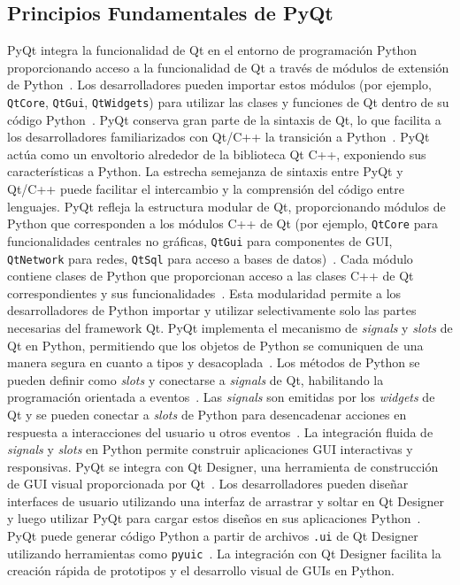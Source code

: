 \subsection{Principios Fundamentales de PyQt}
PyQt integra la funcionalidad de Qt en el entorno de programación Python proporcionando acceso a la funcionalidad de Qt a través de módulos de extensión de Python~\cite{tutorialspoint_pyqt}. Los desarrolladores pueden importar estos módulos (por ejemplo, \texttt{QtCore}, \texttt{QtGui}, \texttt{QtWidgets}) para utilizar las clases y funciones de Qt dentro de su código Python~\cite{tutorialspoint_pyqt}. PyQt conserva gran parte de la sintaxis de Qt, lo que facilita a los desarrolladores familiarizados con Qt/C++ la transición a Python~\cite{qt_for_python}. PyQt actúa como un envoltorio alrededor de la biblioteca Qt C++, exponiendo sus características a Python. La estrecha semejanza de sintaxis entre PyQt y Qt/C++ puede facilitar el intercambio y la comprensión del código entre lenguajes.
PyQt refleja la estructura modular de Qt, proporcionando módulos de Python que corresponden a los módulos C++ de Qt (por ejemplo, \texttt{QtCore} para funcionalidades centrales no gráficas, \texttt{QtGui} para componentes de GUI, \texttt{QtNetwork} para redes, \texttt{QtSql} para acceso a bases de datos)~\cite{tutorialspoint_pyqt}. Cada módulo contiene clases de Python que proporcionan acceso a las clases C++ de Qt correspondientes y sus funcionalidades~\cite{tutorialspoint_pyqt}. Esta modularidad permite a los desarrolladores de Python importar y utilizar selectivamente solo las partes necesarias del framework Qt.
PyQt implementa el mecanismo de \textit{signals} y \textit{slots} de Qt en Python, permitiendo que los objetos de Python se comuniquen de una manera segura en cuanto a tipos y desacoplada~\cite{businesscloud}. Los métodos de Python se pueden definir como \textit{slots} y conectarse a \textit{signals} de Qt, habilitando la programación orientada a eventos~\cite{businesscloud}. Las \textit{signals} son emitidas por los \textit{widgets} de Qt y se pueden conectar a \textit{slots} de Python para desencadenar acciones en respuesta a interacciones del usuario u otros eventos~\cite{businesscloud}. La integración fluida de \textit{signals} y \textit{slots} en Python permite construir aplicaciones GUI interactivas y responsivas.
PyQt se integra con Qt Designer, una herramienta de construcción de GUI visual proporcionada por Qt~\cite{businesscloud}. Los desarrolladores pueden diseñar interfaces de usuario utilizando una interfaz de arrastrar y soltar en Qt Designer y luego utilizar PyQt para cargar estos diseños en sus aplicaciones Python~\cite{lemberg}. PyQt puede generar código Python a partir de archivos \texttt{.ui} de Qt Designer utilizando herramientas como \texttt{pyuic}~\cite{tutorialspoint_pyqt}. La integración con Qt Designer facilita la creación rápida de prototipos y el desarrollo visual de GUIs en Python.

